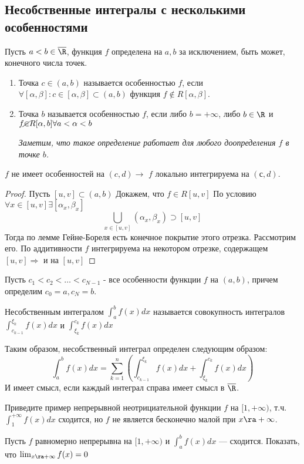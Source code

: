 \subsection{Несобственные интегралы с несколькими особенностями}
\begin{definition}
    Пусть \(a < b \in \overline{\R}\), функция \(f\) определена на \(a, b\) за исключением, быть может, конечного числа точек. 
    \begin{enumerate}
        \item Точка \(c \in (a, b)\) называется особенностью \(f\), если \(\forall [\alpha, \beta]: c \in [\alpha, \beta] \subset (a, b)\) функция \(f \notin R[\alpha, \beta]\). 
        
        \item Точка \(b\) называется особенностью \(f\), если либо $b = +\infty$, либо $b \in \R$ и $f \cancel{\in} R[\alpha, b] \forall a < \alpha < b$

        \textit{Заметим, что такое определение работает для любого доопределения $f$ в точке $b$.}
    \end{enumerate}
\end{definition}
\begin{note}
    $f$ не имеет особенностей на $(c, d) \rightarrow$ $f$ локально интегрируема на $(с, d)$.
\end{note}
\begin{proof}
    Пусть $[u,v] \subset (a,b)$
    Докажем, что $f \in R [u,v]$
    По условию $\forall x \in [u,v] \exists [\alpha_x,\beta_x]$
    $$\bigcup_{x \in [u, v]}(\alpha_x, \beta_x) \supset [u, v]$$
    Тогда по лемме Гейне-Бореля есть конечное покрытие этого отрезка. 
    Рассмотрим его.
    По аддитивности $f$ интегрируема на некотором отрезке, содержащем $[u, v] \Rightarrow$ и на $[u, v]$
\end{proof}
\begin{definition}
    Пусть $c_1 < c_2 < \dots < c_{N-1} $ - все особенности функции $f$ на $(a, b)$, причем определим \(c_0 = a, c_N = b\).

\end{definition}

Несобственным интегралом $\int_{a}^b f(x) dx$ называется совокупность интегралов $\int_{c_{k-1}}^{\xi_k}f(x)dx$ и $\int_{\xi_k}^{c_k} f(x)dx$

Таким образом, несобственный интеграл определен следующим образом:
\[\int_a^b f(x)dx = \sum_{k = 1}^n\left(\int_{c_{k - 1}}^{\xi_k}f(x)dx + \int_{\xi_{k}}^{c_{k}}f(x)dx\right)\]    
И имеет смысл, если каждый интеграл справа имеет смысл в $\overline{\R}$.

\begin{problem}
    Приведите пример непрерывной неотрициательной функции \(f\) на \([1, +\infty)\), т.ч. \(\int_1^{+\infty}f(x)dx\) сходится, но \(f\) не является бесконечно малой при \(x \ra +\infty\).
\end{problem}
\begin{problem}
    Пусть \(f\) равномерно непрерывна на \([1, +\infty)\) и \(\int_a^b f(x)dx\) --- сходится. Показать, что \(\lim_{x\ra+\infty}f(x) = 0\)
\end{problem}
